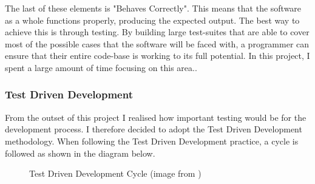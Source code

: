 The last of these elements is "Behaves Correctly". This means that the software as a whole functions properly, producing the expected output. The best way to achieve this is through testing. By building large test-suites that are able to cover most of the possible cases that the software will be faced with, a programmer can ensure that their entire code-base is working to its full potential. In this project, I spent a large amount of time focusing on this area..

\subsubsection{Test Driven Development \label{TDD}}
From the outset of this project I realised how important testing would be for the development process. I therefore decided to adopt the Test Driven Development methodology. When following the Test Driven Development practice, a cycle is followed as shown in the diagram below.

\begin{figure}[!ht]
	\centering
	\caption{Test Driven Development Cycle (image from \cite{SED})}
\end{figure}

